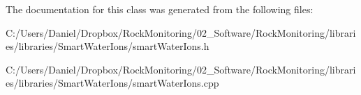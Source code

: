 The documentation for this class was generated from the following files\+:\begin{DoxyCompactItemize}
\item 
C\+:/\+Users/\+Daniel/\+Dropbox/\+Rock\+Monitoring/02\+\_\+\+Software/\+Rock\+Monitoring/libraries/libraries/\+Smart\+Water\+Ions/smart\+Water\+Ions.\+h\item 
C\+:/\+Users/\+Daniel/\+Dropbox/\+Rock\+Monitoring/02\+\_\+\+Software/\+Rock\+Monitoring/libraries/libraries/\+Smart\+Water\+Ions/smart\+Water\+Ions.\+cpp\end{DoxyCompactItemize}
